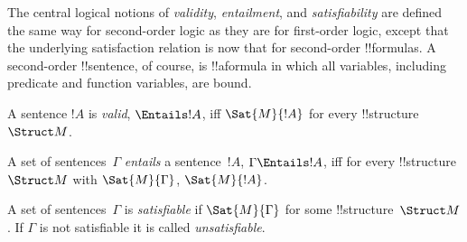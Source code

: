 \documentclass[../../../include/open-logic-section]{subfiles}
\begin{document}

\begin{explain}
The central logical notions of \emph{validity}, \emph{entailment}, and
\emph{satisfiability} are defined the same way for second-order logic
as they are for first-order logic, except that the underlying
satisfaction relation is now that for second-order !!{formula}s.  A
second-order !!{sentence}, of course, is !!a{formula} in which all
variables, including predicate and function variables, are bound.
\end{explain}

\begin{defn}[Validity]
A sentence $!A$ is \emph{valid}, $\Entails !A$, iff $\Sat{M}{!A}$ for every
!!{structure}~$\Struct M$.
\end{defn}

\begin{defn}[Entailment]
A set of sentences~$\Gamma$ \emph{entails} a sentence~$!A$, $\Gamma
\Entails !A$, iff for every !!{structure}~$\Struct M$ with
$\Sat{M}{\Gamma}$, $\Sat{M}{!A}$.
\end{defn}

\begin{defn}[Satisfiability]
A set of sentences~$\Gamma$ is \emph{satisfiable} if $\Sat{M}{\Gamma}$
for some !!{structure}~$\Struct M$.  If $\Gamma$ is not satisfiable it is
called \emph{unsatisfiable}.
\end{defn}
\end{document}
